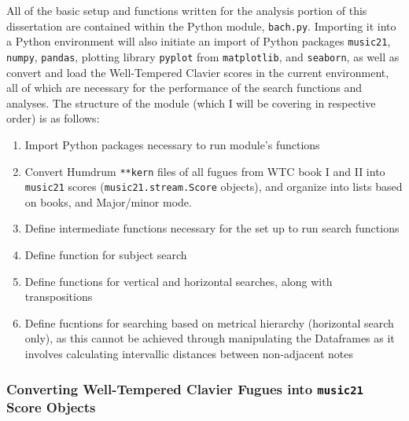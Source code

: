     All of the basic setup and functions written for the analysis portion of
this dissertation are contained within the Python module,
\texttt{bach.py}. Importing it into a Python environment will also
initiate an import of Python packages \texttt{music21}, \texttt{numpy},
\texttt{pandas}, plotting library \texttt{pyplot} from
\texttt{matplotlib}, and \texttt{seaborn}, as well as convert and load
the Well-Tempered Clavier scores in the current environment, all of
which are necessary for the performance of the search functions and
analyses. The structure of the module (which I will be covering in
respective order) is as follows:

\begin{enumerate}
\def\labelenumi{\arabic{enumi}.}
\tightlist
\item
  Import Python packages necessary to run module's functions
\item
  Convert Humdrum \texttt{**kern} files of all fugues from WTC book I
  and II into \texttt{music21} scores (\texttt{music21.stream.Score}
  objects), and organize into lists based on books, and Major/minor
  mode.
\item
  Define intermediate functions necessary for the set up to run search
  functions
\item
  Define function for subject search
\item
  Define functions for vertical and horizontal searches, along with
  transpositions
\item
  Define fucntions for searching based on metrical hierarchy (horizontal
  search only), as this cannot be achieved through manipulating the
  Dataframes as it involves calculating intervallic distances between
  non-adjacent notes
\end{enumerate}

\subsubsection{\texorpdfstring{Converting Well-Tempered Clavier Fugues
into \texttt{music21} Score
Objects}{Converting Well-Tempered Clavier Fugues into music21 Score Objects}}\label{converting-well-tempered-clavier-fugues-into-music21-score-objects}

